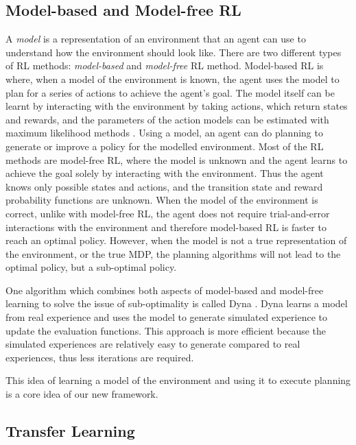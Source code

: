 \documentclass[11pt,twoside]{report}
\theoremstyle{plain}
\theoremstyle{definition}
\begin{document}
\subsection{Model-based and Model-free RL}
\label{model_base_model_free_subsection}
A \textit{model} is a representation of an environment that an agent can use to understand how the environment should look like. 
There are two different types of RL methods: \textit{model-based} and \textit{model-free} RL method. 
Model-based RL is where, when a model of the environment is known, the agent uses the model to plan for a series of actions to achieve the agent's goal. 
The model itself can be learnt by interacting with the environment by taking actions, which return states and rewards, and the parameters of the action models can be estimated with maximum likelihood methods \cite{Ray2010}.
Using a model, an agent can do planning to generate or improve a policy for the modelled environment. 
Most of the RL methods are model-free RL, where the model is unknown and the agent learns to achieve the goal solely by interacting with the environment. 
Thus the agent knows only possible states and actions, and the transition state and reward probability functions are unknown.
When the model of the environment is correct, unlike with model-free RL, the agent does not require trial-and-error interactions with the environment and therefore model-based RL is faster to reach an optimal policy. 
However, when the model is not a true representation of the environment, or the true MDP, the planning algorithms will not lead to the optimal policy, but a sub-optimal policy.

One algorithm which combines both aspects of model-based and model-free learning to solve the issue of sub-optimality is called Dyna \cite{Sutton1990}.
Dyna learns a model from real experience and uses the model to generate simulated experience to update the evaluation functions.
This approach is more efficient because the simulated experiences are relatively easy to generate compared to real experiences, thus less iterations are required.

This idea of learning a model of the environment and using it to execute planning is a core idea of our new framework. 

\subsection{Transfer Learning}
\label{transfer_learning}
\end{document}
